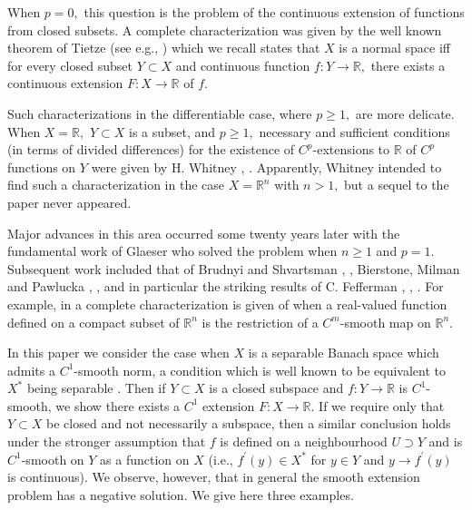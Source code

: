 \documentclass[11pt]{amsproc}%
\theoremstyle{plain}
\numberwithin{equation}{section}
\begin{document}
When $p=0,$ this question is the problem of the continuous extension of
functions from closed subsets. A complete characterization was given by the
well known theorem of Tietze (see e.g., \cite{Wi}) which we recall states that
$X$ is a normal space iff for every closed subset $Y\subset X$ and continuous
function $f:Y\rightarrow\mathbb{R},$ there exists a continuous extension
$F:X\rightarrow\mathbb{R}$ of $f.$

Such characterizations in the differentiable case, where $p\geq1,$ are more
delicate. When $X=\mathbb{R},$ $Y\subset X$ is a subset, and $p\geq1,$
necessary and sufficient conditions (in terms of divided differences) for the
existence of $C^{p}$-extensions to $\mathbb{R}$ of $C^{p}$ functions on $Y$
were given by H. Whitney \cite{W1}, \cite{W2}. Apparently, Whitney intended to
find such a characterization in the case $X=\mathbb{R}^{n}$ with $n>1,$ but a
sequel to the paper \cite{W2} never appeared.

\medskip

Major advances in this area occurred some twenty years later with the
fundamental work of Glaeser \cite{G} who solved the problem when $n\geq1$ and
$p=1$. Subsequent work included that of Brudnyi and Shvartsman \cite{BS1},
\cite{BS2}, Bierstone, Milman and Pawlucka \cite{BMP1}, \cite{BMP2}, and in
particular the striking results of C. Fefferman \cite{Fe1}, \cite{Fe2},
\cite{Fe3}. For example, in \cite{Fe2} a complete characterization is given of
when a real-valued function defined on a compact subset of $\mathbb{R}^{n}$ is
the restriction of a $C^{m}$-smooth map on $\mathbb{R}^{n}.$

\medskip

In this paper we consider the case when $X$ is a separable Banach space which
admits a $C^{1}$-smooth norm, a condition which is well known to be equivalent
to $X^{*}$ being separable \cite{DGZ}. Then if $Y\subset X$ is a closed
subspace and $f:Y\rightarrow\mathbb{R}$ is $C^{1}$-smooth, we show there
exists a $C^{1}$ extension $F:X\rightarrow\mathbb{R}$. If we require only that
$Y\subset X$ be closed and not necessarily a subspace, then a similar
conclusion holds under the stronger assumption that $f$ is defined on a
neighbourhood $U\supset Y$ and is $C^{1}$-smooth on $Y$ as a function on $X$
(i.e., $f^{\prime}\left(  y\right)  \in X^{\ast}$ for $y\in Y$ and
$y\rightarrow f^{\prime}\left(  y\right)  $ is continuous). We observe,
however, that in general the smooth extension problem has a negative solution.
We give here three examples.
\end{document}
